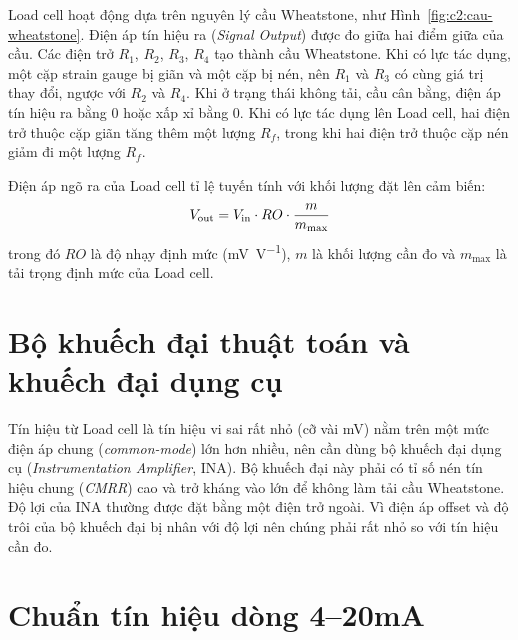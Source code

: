Load cell hoạt động dựa trên nguyên lý cầu Wheatstone, như Hình~\ref{fig:c2:cau-wheatstone}. Điện áp
tín hiệu ra (\textit{Signal Output}) được đo giữa hai điểm giữa của cầu. Các điện trở $R_1$, $R_2$,
$R_3$, $R_4$ tạo thành cầu Wheatstone. Khi có lực tác dụng, một cặp strain gauge bị giãn và một cặp
bị nén, nên $R_1$ và $R_3$ có cùng giá trị thay đổi, ngược với $R_2$ và $R_4$. Khi ở trạng thái không
tải, cầu cân bằng, điện áp tín hiệu ra bằng 0 hoặc xấp xỉ bằng 0. Khi có lực tác dụng lên Load cell,
hai điện trở thuộc cặp giãn tăng thêm một lượng $R_f$, trong khi hai điện trở thuộc cặp nén giảm đi
một lượng $R_f$.


Điện áp ngõ ra của Load cell tỉ lệ tuyến tính với khối lượng đặt lên cảm biến:
\begin{equation}
    V_{\mathrm{out}} = V_{\mathrm{in}} \cdot RO \cdot \frac{m}{m_{\max}}
    \label{eq:c2:vout-loadcell}
\end{equation}
trong đó $RO$ là độ nhạy định mức (\unit{\milli\volt\per\volt}), $m$ là khối lượng cần đo
và $m_{\max}$ là tải trọng định mức của Load cell.

\section{Bộ khuếch đại thuật toán và khuếch đại dụng cụ}
\label{sec:c2:opamp}

Tín hiệu từ Load cell là tín hiệu vi sai rất nhỏ (cỡ vài \unit{\milli\volt}) nằm trên một mức điện áp
chung (\textit{common-mode}) lớn hơn nhiều, nên cần dùng bộ khuếch đại dụng cụ
(\textit{Instrumentation Amplifier}, INA). Bộ khuếch đại này phải có tỉ số nén tín hiệu chung
(\textit{CMRR}) cao và trở kháng vào lớn để không làm tải cầu Wheatstone. Độ lợi của INA thường được
đặt bằng một điện trở ngoài. Vì điện áp offset và độ trôi của bộ khuếch đại bị nhân với độ lợi nên
chúng phải rất nhỏ so với tín hiệu cần đo.


\section{Chuẩn tín hiệu dòng 4--20mA}
\label{sec:c2:chuan-4-20ma}

